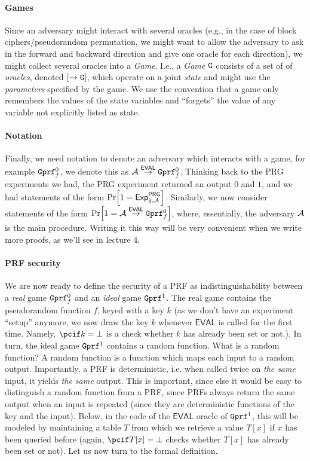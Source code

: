 \documentclass[a4paper,table,dvipsnames]{article}
\theoremstyle{definition}
\newcommand{\M}[1]{\ensuremath{\text{\texttt{#1}}}}
\renewcommand{\O}[1]{\ensuremath{\mathsf{#1}}}
\newcommand{\outinterface}[1]{[\rightarrow#1]} %
\begin{document}
\paragraph{Games}
Since an adversary might interact with several oracles (e.g., in the case of block ciphers/pseudorandom
permutation, we might want to allow the adversary to ask in the forward and backward direction and give
one oracle for each direction), we might collect several oracles into a \emph{Game}. I.e., a \emph{Game} 
$\M{G}$ consists of a set of of \emph{oracles}, denoted $\outinterface{\M{G}}$, which operate on a
joint \emph{state} and might use the \emph{parameters} specified by the game. We use the convention
that a game only remembers the values of the state variables and ``forgets'' the value of any variable
not explicitly listed as state.

\paragraph{Notation}
Finally, we need notation to denote an adversary which interacts with a game, for example $\M{Gprf}^0_f$, 
we denote this as $\adv\stackrel{\O{EVAL}}{\rightarrow}\M{Gprf}^0_f$. Thinking back to the PRG
experiments we had, the PRG experiment returned an output $0$ and $1$, and we had statements of 
the form $\prob{1=\mathsf{Exp}^{\O{PRG}}_{g,\adv}}$. Similarly, we now consider statements of the form
$\prob{1=\adv\stackrel{\O{EVAL}}{\rightarrow}\M{Gprf}^0_f}$, where, essentially, the adversary $\mathcal{A}$
is the main procedure. Writing it this way will be very convenient when we write more proofs, as we'll see
in lecture 4.


\paragraph{PRF security}
We are now ready to define the security of a PRF as indistinguishability between a \emph{real} game
$\M{Gprf}^0_f$ and an \emph{ideal} game $\M{Gprf}^1$. The real game contains the pseudorandom function $f$,
keyed with a key $k$ (as we don't have an experiment ``setup'' anymore, we now draw the key $k$
whenever $\O{EVAL}$ is called for the first time. Namely, $\pcif k=\bot$ is a check whether $k$ has
already been set or not.). In turn, the ideal game $\M{Gprf}^1$ contains a random function. What is a
random function? A random function is a function which maps each input to a random output. Importantly, a PRF is deterministic, i.e.
when called twice on \emph{the same} input, it yields \emph{the same} output. This is important, since
else it would be easy to distinguish a random function from a PRF, since PRFs always return the same
output when an input is repeated (since they are deterministic functions of the key and the input).
Below, in the code of the $\O{EVAL}$ oracle of $\M{Gprf}^1$, this will be modeled by maintaining a table
$T$ from which we retrieve a value $T[x]$ if $x$ has been queried before (again, $\pcif T[x]=\bot$ checks
whether $T[x]$ has already been set or not). Let us now turn to the formal definition.
\end{document}
